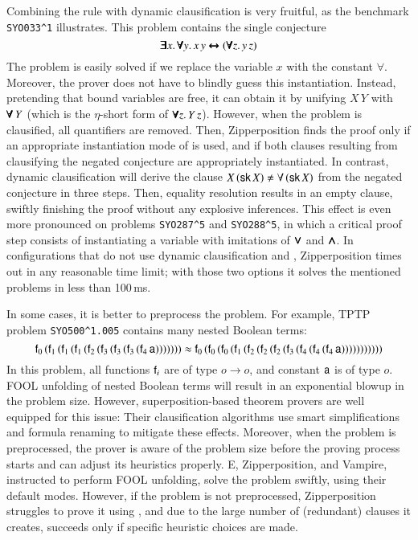 Combining the rule  with dynamic clausification is very fruitful, as
the benchmark \texttt{SYO033\^{}1} illustrates. This problem contains the
single conjecture
$$ \pmb{\exists} x. \, \pmb{\forall} y.  \, x \, y \pmb{\leftrightarrow} (\pmb{\forall} z. \, y \,z)$$ The
problem is easily solved if we replace the variable $x$ with the constant $\forall$.
Moreover, the prover does not have to blindly guess this instantiation. Instead,
pretending that bound variables are free, it can obtain it by unifying $  X \, Y
$ with $ \pmb{\forall} \, Y$ (which is the $\eta$-short form of $\pmb{\forall} z. \, Y
\,z$). However, when the problem is clausified, all quantifiers are removed.
Then, Zipperposition finds the proof only if an appropriate instantiation mode of
 is used, and if both clauses resulting from clausifying the negated
conjecture are appropriately instantiated. In contrast, dynamic clausification will
derive the clause $ X \, (\cst{sk} \, X) \not\eq \forall \, (\cst{sk} \, X) $
from the negated conjecture in three steps. Then, equality resolution results in
an empty clause, swiftly finishing the proof without any explosive inferences.
This effect is even more pronounced on problems \verb|SYO287^5| and
\verb|SYO288^5|, in which a critical proof step consists of instantiating a variable
with imitations of $\pmb{\lor}$ and $\pmb{\land}$. In configurations that do not use dynamic
clausification and , Zipperposition times out in any reasonable
time limit; with those two options it solves the mentioned problems in less than
100\,ms.

In some cases, it is better to preprocess the problem. For example, TPTP problem
\verb|SYO500^1.005| contains many nested Boolean terms:
$$ \mathsf{f}_0 \, ( \mathsf{f}_1 \, ( \mathsf{f}_1 \, ( \mathsf{f}_1 \, ( \mathsf{f}_2 \, ( \mathsf{f}_3 \, ( \mathsf{f}_3 \, ( \mathsf{f}_3 \, ( \mathsf{f}_4 \, \mathsf{a} ) ) ) ) ) ) ) 
    \approx \mathsf{f}_0 \, ( \mathsf{f}_0 \, ( \mathsf{f}_0 \, ( \mathsf{f}_1 \, ( \mathsf{f}_2 \, ( \mathsf{f}_2 \, ( \mathsf{f}_2 \, ( \mathsf{f}_3 \, ( \mathsf{f}_4 \, ( \mathsf{f}_4 \, ( \mathsf{f}_4 \, \mathsf{a} ) ) ) ) ) ) ) ) ) ) )$$
In this problem, all functions $\mathsf{f}_i$ are of type $o \rightarrow o$, and constant $\mathsf{a}$ is of type $o$.
FOOL unfolding of nested Boolean terms will result in an exponential blowup in the problem size. However,
superposition-based theorem provers are well equipped for this issue: Their clausification algorithms use smart simplifications and
formula renaming to mitigate these effects. Moreover, when the problem is preprocessed, the prover is aware of the problem
size before the proving process starts and can adjust its heuristics properly. E, Zipperposition, and Vampire, instructed to perform FOOL unfolding,
solve the problem swiftly, using their default modes. However, if the problem is not preprocessed, Zipperposition struggles to prove it using
, and due to the large number of (redundant) clauses it creates, succeeds only if specific heuristic choices are made.

